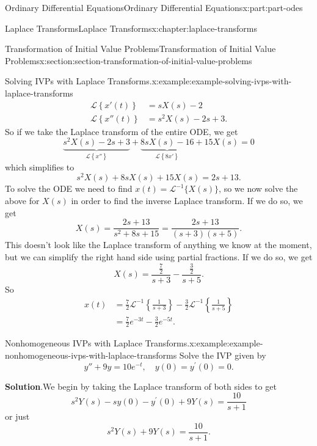 \documentclass[twoside,10pt,]{book}
\newcommand{\blocktitlefont}{\relax}
\numberwithin{equation}{part}
\newcommand{\Laplace}[1]{\mathcal{L}\left\{#1\right\}}
\newcommand{\amp}{&}
\begin{document}
\begin{partptx}{Ordinary Differential Equations}{}{Ordinary Differential Equations}{}{}{x:part:part-odes}
\begin{chapterptx}{Laplace Transforms}{}{Laplace Transforms}{}{}{x:chapter:laplace-transforms}
\begin{sectionptx}{Transformation of Initial Value Problems}{}{Transformation of Initial Value Problems}{}{}{x:section:section-transformation-of-initial-value-problems}
\begin{example}{Solving IVPs with Laplace Transforms.}{x:example:example-solving-ivps-with-laplace-transforms}
\begin{align*}
\Laplace{x'(t)} \amp= sX(s) - 2\\
\Laplace{x''(t)} \amp= s^{2}X(s) - 2s +3\text{.}
\end{align*}
So if we take the Laplace transform of the entire ODE, we get%
\begin{equation*}
\underbrace{s^{2}X(s) - 2s + 3}_{\Laplace{x''}} + \underbrace{8sX(s) - 16}_{\Laplace{8x'}} + 15X(s) = 0
\end{equation*}
which simplifies to%
\begin{equation*}
s^{2}X(s)+8sX(s)+15X(s) = 2s+13.
\end{equation*}
To solve the ODE we need to find \(x(t) = \mathcal{L}^{-1}\{X(s)\}\), so we now solve the above for \(X(s)\) in order to find the inverse Laplace transform. If we do so, we get%
\begin{equation*}
X(s) = \frac{2s+13}{s^{2}+8s+15} = \frac{2s+13}{(s+3)(s+5)}.
\end{equation*}
This doesn't look like the Laplace transform of anything we know at the moment, but we can simplify the right hand side using partial fractions. If we do so, we get%
\begin{equation*}
X(s) = \frac{\frac{7}{2}}{s+3} - \frac{\frac{3}{2}}{s+5}.
\end{equation*}
So%
\begin{align*}
x(t) \amp= \frac{7}{2}\mathcal{L}^{-1}\left\{\frac{1}{s+3}\right\} - \frac{3}{2}\mathcal{L}^{-1}\left\{\frac{1}{s+5}\right\}\\
\amp= \frac{7}{2}e^{-3t} - \frac{3}{2}e^{-5t}\text{.}
\end{align*}
%
\end{example}
\begin{example}{Nonhomogeneous IVPs with Laplace Transforms.}{x:example:example-nonhomogeneous-ivps-with-laplace-transforms}%
Solve the IVP given by%
\begin{equation*}
y''+9y = 10e^{-t},\quad y(0) = y^\prime(0) = 0.
\end{equation*}
%
\par\smallskip%
\noindent\textbf{\blocktitlefont Solution}.\hypertarget{g:solution:idp105548816616992}{}\quad{}We begin by taking the Laplace transform of both sides to get%
\begin{equation*}
s^{2}Y(s) - sy(0) - y^\prime(0) + 9Y(s) = \frac{10}{s+1}
\end{equation*}
or just%
\begin{equation*}
s^{2}Y(s) + 9Y(s) = \frac{10}{s+1}.

\end{equation*}
\end{example}
\end{sectionptx}
\end{chapterptx}
\end{partptx}
\end{document}
